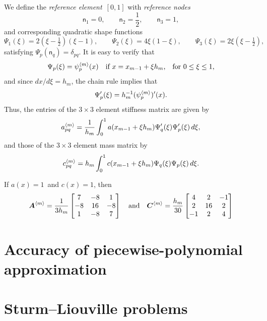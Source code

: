 We define the \emph{reference element}~$[0,1]$ with \emph{reference nodes}
\[
\mathsf{n}_1=0,\qquad\mathsf{n}_2=\frac{1}{2},\qquad\mathsf{n}_3=1,
\]
and corresponding quadratic shape functions
\begin{equation}\label{eq: quadratic shape funcs 1d}
\Psi_1(\xi)=2(\xi-\tfrac12)(\xi-1),\qquad
\Psi_2(\xi)=4\xi(1-\xi),\qquad
\Psi_3(\xi)=2\xi(\xi-\tfrac12),
\end{equation}
satisfying $\Psi_p(\mathsf{n}_q)=\delta_{pq}$.  It is easy to verify that
\[
\Psi_p(\xi)=\psi^{\langle m\rangle}_p(x)\quad
	\text{if $x=x_{m-1}+\xi h_m$,}\quad\text{for $0\le\xi\le1$,}
\]
and since $dx/d\xi=h_m$, the chain rule implies that
\[
\Psi'_p(\xi)=h_m^{-1}(\psi^{\langle m\rangle}_p)'(x).
\]
Thus, the entries of the $3\times3$ element stiffness matrix are given by
\begin{equation}\label{eq: a mpq reference 1d}
a^{\langle m\rangle}_{pq}=\frac{1}{h_m}\int_0^1a(x_{m-1}+\xi h_m)
	\Psi'_q(\xi)\Psi'_p(\xi)\,d\xi,
\end{equation}
and those of the $3\times3$ element mass matrix by
\begin{equation}\label{eq: c mpq reference 1d}
c^{\langle m\rangle}_{pq}=h_m\int_0^1c(x_{m-1}+\xi h_m)
	\Psi_q(\xi)\Psi_p(\xi)\,d\xi.
\end{equation}

\begin{example}
If $a(x)=1$~and $c(x)=1$, then
\begin{equation}\label{eq: element matrices quadratic 1d}
\boldsymbol{A}^{\langle m\rangle}=\frac{1}{3h_m}\begin{bmatrix}
 7&-8& 1\\
-8&16&-8\\
 1&-8& 7\end{bmatrix}
\quad\text{and}\quad
\boldsymbol{C}^{\langle m\rangle}=\frac{h_m}{30}\begin{bmatrix}
 4& 2&-1\\
 2&16& 2\\
-1& 2& 4 \end{bmatrix}
\end{equation}
\end{example}


\section{Accuracy of piecewise-polynomial approximation}

\section{Sturm--Liouville problems}


